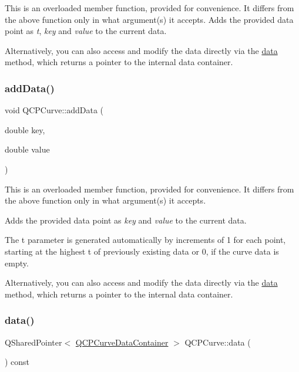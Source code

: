 This is an overloaded member function, provided for convenience. It differs from the above function only in what argument(s) it accepts. Adds the provided data point as {\itshape t}, {\itshape key} and {\itshape value} to the current data.

Alternatively, you can also access and modify the data directly via the \hyperlink{classQCPCurve_a761492fd00b1ab7cb18ce23c118c6c60}{data} method, which returns a pointer to the internal data container. \mbox{\label{classQCPCurve_ada4762e793cd5707b33f35b8a4b0f8fb}} 
\subsubsection{\texorpdfstring{add\+Data()}{addData()}\hspace{0.1cm}{\footnotesize\ttfamily [4/4]}}
{\footnotesize\ttfamily void Q\+C\+P\+Curve\+::add\+Data (\begin{DoxyParamCaption}\item[{double}]{key,  }\item[{double}]{value }\end{DoxyParamCaption})}

This is an overloaded member function, provided for convenience. It differs from the above function only in what argument(s) it accepts.

Adds the provided data point as {\itshape key} and {\itshape value} to the current data.

The t parameter is generated automatically by increments of 1 for each point, starting at the highest t of previously existing data or 0, if the curve data is empty.

Alternatively, you can also access and modify the data directly via the \hyperlink{classQCPCurve_a761492fd00b1ab7cb18ce23c118c6c60}{data} method, which returns a pointer to the internal data container. \mbox{\label{classQCPCurve_a761492fd00b1ab7cb18ce23c118c6c60}} 
\subsubsection{\texorpdfstring{data()}{data()}}
{\footnotesize\ttfamily Q\+Shared\+Pointer$<$ \hyperlink{classQCPDataContainer}{Q\+C\+P\+Curve\+Data\+Container} $>$ Q\+C\+P\+Curve\+::data (\begin{DoxyParamCaption}{ }\end{DoxyParamCaption}) const\hspace{0.3cm}{\ttfamily [inline]}}

